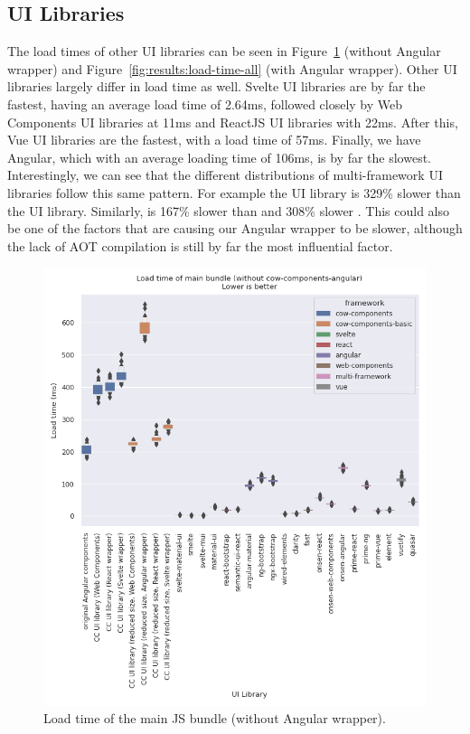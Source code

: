 \subsection{UI Libraries}
The load times of other UI libraries can be seen in Figure~\ref{fig:results:load-time-all-no-angular} (without Angular wrapper) and Figure~\ref{fig:results:load-time-all} (with Angular wrapper). Other UI libraries largely differ in load time as well. Svelte UI libraries are by far the fastest, having an average load time of 2.64ms, followed closely by Web Components UI libraries at 11ms and ReactJS UI libraries with 22ms. After this, Vue UI libraries are the fastest, with a load time of 57ms. Finally, we have Angular, which with an average loading time of 106ms, is by far the slowest. Interestingly, we can see that the different distributions of multi-framework UI libraries follow this same pattern. For example the  UI library is 329\% slower than the  UI library. Similarly,  is 167\% slower than  and 308\% slower . This could also be one of the factors that are causing our Angular wrapper to be slower, although the lack of AOT compilation is still by far the most influential factor.

\begin{figure}[htbp]
  \includegraphics[width=\columnwidth]{plots/load-time-all-no-angular.png}
  \caption{Load time of the main JS bundle (without Angular wrapper).}
  \label{fig:results:load-time-all-no-angular}
  \centering
\end{figure}

